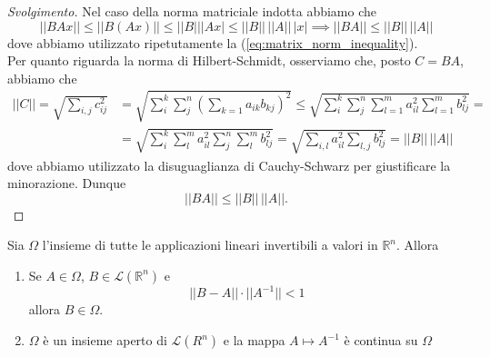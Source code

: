 \begin{proof}[Svolgimento]
    Nel caso della norma matriciale indotta abbiamo che
    $$
    || BAx || \leq || B(Ax) || \leq || B || |Ax| \leq || B || \, || A || \, |x| \implies || BA || \leq || B || \, || A ||
    $$
    dove abbiamo utilizzato ripetutamente la (\ref{eq:matrix_norm_inequality}). \\
    Per quanto riguarda la norma di Hilbert-Schmidt, osserviamo che, posto $C = BA$, abbiamo che
    \begin{align*}
    || C || = \sqrt{\sum_{i, j} c_{ij}^2} &= \sqrt{\sum_{i}^k \sum_j^n \left( \sum_{k=1} a_{ik} b_{kj} \right)^2} \leq \sqrt{\sum_{i}^k \sum_j^n \sum_{l=1}^m a_{il}^2 \sum_{l=1}^m b_{lj}^2} = \\
    &= \sqrt{\sum_i^k \sum_{l}^m a_{il}^2 \sum_{j}^n \sum_{l}^m b_{lj}^2} = \sqrt{\sum_{i, l} a_{il}^2 \sum_{l, j} b_{lj}^2} = || B || \, || A ||
    \end{align*}
    dove abbiamo utilizzato la disuguaglianza di Cauchy-Schwarz per giustificare la minorazione. Dunque
    $$
    || BA || \leq || B || \, || A ||.
    $$
\end{proof}
\begin{theorem}
    Sia $\mathit{\Omega}$ l'insieme di tutte le applicazioni lineari invertibili a valori in $\mathbb{R}^n$. Allora
    \begin{enumerate}[label=\protect\circled{\arabic*}]
        \item Se $A \in \mathit{\Omega}$, $B \in \mathcal{L}(\mathbb{R}^n)$ e
        \begin{equation*}
            || B - A || \cdot || A^{-1} || < 1 \tag{$\ast$}
        \end{equation*}
        allora $B \in \mathit{\Omega}$.
        \item $\mathit{\Omega}$ è un insieme aperto di $\mathcal{L}(R^n)$ e la mappa $A \mapsto A^{-1}$ è continua su $\mathit{\Omega}$ 
    \end{enumerate}
    \label{thm:continuity_of_the_inverse_matrix}
\end{theorem}
